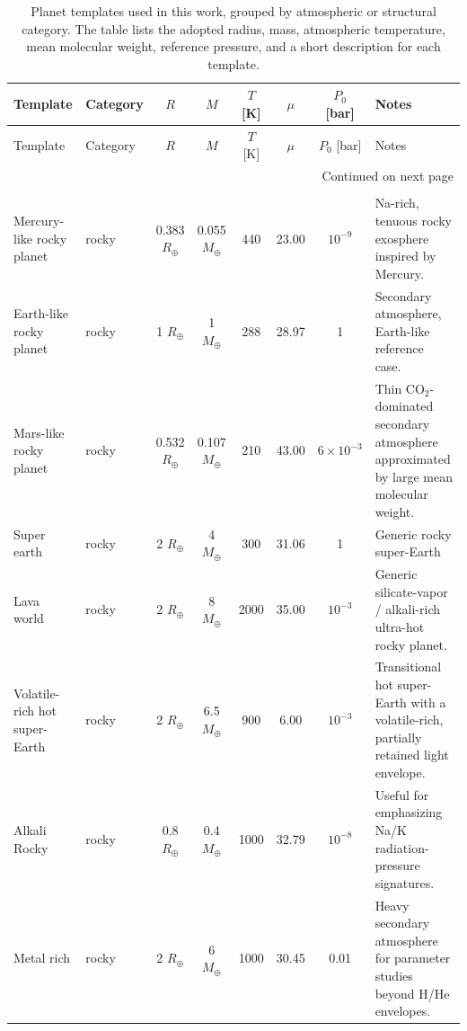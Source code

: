 \begin{longtable}{llcccccl}
\caption{Planet templates used in this work, grouped by atmospheric or structural category. The table lists the adopted radius, mass, atmospheric temperature, mean molecular weight, reference pressure, and a short description for each template.}\label{tab:planet_templates_properties} \\
\toprule
Template & Category & $R$ & $M$ & $T$ [K] & $\mu$ & $P_0$ [bar] & Notes \\
\midrule
\endfirsthead

\toprule
Template & Category & $R$ & $M$ & $T$ [K] & $\mu$ & $P_0$ [bar] & Notes \\
\midrule
\endhead

\midrule
\multicolumn{8}{r}{Continued on next page} \\
\midrule
\endfoot

\bottomrule
\endlastfoot

\multicolumn{8}{l}{\textbf{Rocky / terrestrial templates}} \\
\midrule
Mercury-like rocky planet & rocky & 0.383 $R_\oplus$ & 0.055 $M_\oplus$ & 440 & 23.00 & $10^{-9}$ & Na-rich, tenuous rocky exosphere inspired by Mercury. \\
Earth-like rocky planet & rocky & 1 $R_\oplus$ & 1 $M_\oplus$ & 288 & 28.97 & 1 & Secondary atmosphere, Earth-like reference case. \\
Mars-like rocky planet & rocky & 0.532 $R_\oplus$ & 0.107 $M_\oplus$ & 210 & 43.00 & $6\times10^{-3}$ & Thin CO$_{2}$-dominated secondary atmosphere approximated by large mean molecular weight. \\
Super earth & rocky & 2 $R_\oplus$ & 4 $M_\oplus$ & 300 & 31.06 & 1 & Generic rocky super-Earth \\
Lava world & rocky & 2 $R_\oplus$ & 8 $M_\oplus$ & 2000 & 35.00 & $10^{-3}$ & Generic silicate-vapor / alkali-rich ultra-hot rocky planet. \\
Volatile-rich hot super-Earth & rocky & 2 $R_\oplus$ & 6.5 $M_\oplus$ & 900 & 6.00 & $10^{-3}$ & Transitional hot super-Earth with a volatile-rich, partially retained light envelope. \\
Alkali Rocky & rocky & 0.8 $R_\oplus$ & 0.4 $M_\oplus$ & 1000 & 32.79 & $10^{-8}$ & Useful for emphasizing Na/K radiation-pressure signatures. \\
Metal rich & rocky & 2 $R_\oplus$ & 6 $M_\oplus$ & 1000 & 30.45 & 0.01 & Heavy secondary atmosphere for parameter studies beyond H/He envelopes. \\
\midrule


\end{longtable}
